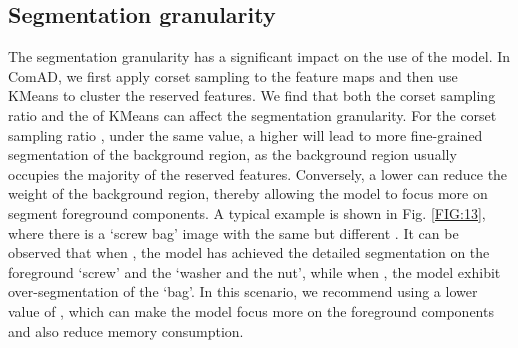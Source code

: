\documentclass[final,5p,times,twocolumn]{elsarticle}
\begin{document}
\begin{table*}[t]
\caption{Quantitative comparisons of image-level detection results with different selected features on the logical anomaly detection benchmarks. The results are represented as (logical anomaly detection AUROC \%, structural anomaly detection AUROC \%) }
\centering
\label{Table8}
\end{table*}

\subsection{Segmentation granularity}
\label{5.2}
The segmentation granularity has a significant impact on the use of the model. In ComAD, we first apply corset sampling to the feature maps and then use KMeans to cluster the reserved features. We find that both the corset sampling ratio  and the  of KMeans can affect the segmentation granularity. 
For the corset sampling ratio , under the same  value, a higher  will lead to more fine-grained segmentation of the background region, as the background region usually occupies the majority of the reserved features. Conversely, a lower  can reduce the weight of the background region, thereby allowing the model to focus more on segment foreground components. A typical example is shown in Fig. \ref{FIG:13}, where there is a `screw bag' image with the same  but different . It can be observed that when , the model has achieved the detailed segmentation on the foreground `screw' and the `washer and the nut', while when , the model exhibit over-segmentation of the `bag'. In this scenario, we recommend using a lower value of , which can make the model focus more on the foreground components and also reduce memory consumption.
\end{document}
